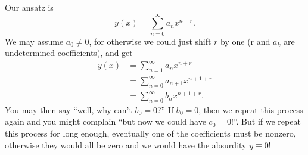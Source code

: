 \documentclass[11pt, letterpaper, oneside]{article}     %
\numberwithin{equation}{subsection}
\theoremstyle{definition}
\numberwithin{theorem}{section}
\theoremstyle{remark}
\begin{document}
\begin{enumerate}
  Our ansatz is
  \begin{equation}
    y(x) = \sum_{n=0}^\infty a_nx^{n+r}.
  \end{equation}
  We may assume $a_0 \neq 0$, for otherwise we could just shift $r$ by one (r and $a_k$ are undetermined coefficients), and get
  \begin{align}
    y(x) &= \sum_{n=1}^\infty a_nx^{n+r}\\
    &= \sum_{n=0}^\infty a_{n+1}x^{n+1+r}\\
    &= \sum_{n=0}^\infty b_nx^{n+1+r}.
  \end{align}
  You may then say ``well, why can't $b_0 = 0$?'' If $b_0 = 0$, then we repeat this process again and you might complain ``but now we could have $c_0 = 0$!''. But if we repeat this process for long enough, eventually one of the coefficients must be nonzero, otherwise they would all be zero and we would have the absurdity $y \equiv 0$!


\end{enumerate}
\end{document}
